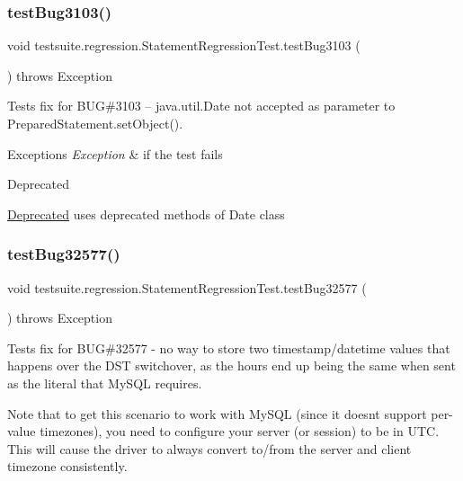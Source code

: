 \subsubsection{\texorpdfstring{test\+Bug3103()}{testBug3103()}}
{\footnotesize\ttfamily void testsuite.\+regression.\+Statement\+Regression\+Test.\+test\+Bug3103 (\begin{DoxyParamCaption}{ }\end{DoxyParamCaption}) throws Exception}

Tests fix for B\+UG\#3103 -- java.\+util.\+Date not accepted as parameter to Prepared\+Statement.\+set\+Object().


\begin{DoxyExceptions}{Exceptions}
{\em Exception} & if the test fails\\
\hline
\end{DoxyExceptions}
\begin{DoxyRefDesc}{Deprecated}
\item[\mbox{\hyperlink{deprecated__deprecated000007}{Deprecated}}]uses deprecated methods of Date class \end{DoxyRefDesc}
\mbox{\label{classtestsuite_1_1regression_1_1_statement_regression_test_a46c9677cc1878bfd4f5da911d30cac02}} 
\subsubsection{\texorpdfstring{test\+Bug32577()}{testBug32577()}}
{\footnotesize\ttfamily void testsuite.\+regression.\+Statement\+Regression\+Test.\+test\+Bug32577 (\begin{DoxyParamCaption}{ }\end{DoxyParamCaption}) throws Exception}

Tests fix for B\+UG\#32577 -\/ no way to store two timestamp/datetime values that happens over the D\+ST switchover, as the hours end up being the same when sent as the literal that My\+S\+QL requires.

Note that to get this scenario to work with My\+S\+QL (since it doesn\textquotesingle{}t support per-\/value timezones), you need to configure your server (or session) to be in U\+TC. This will cause the driver to always convert to/from the server and client timezone consistently.


